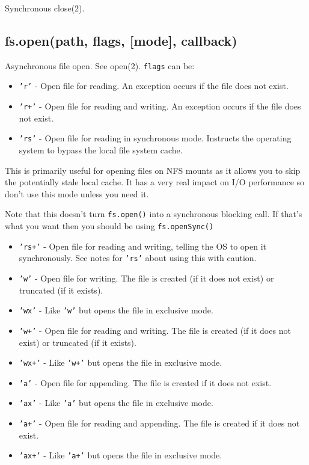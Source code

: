 Synchronous close(2).

\subsection{fs.open(path, flags, {[}mode{]}, callback)}

Asynchronous file open. See open(2). \texttt{flags} can be:

\begin{itemize}
\item
  \texttt{'r'} - Open file for reading. An exception occurs if the file
  does not exist.
\item
  \texttt{'r+'} - Open file for reading and writing. An exception occurs
  if the file does not exist.
\item
  \texttt{'rs'} - Open file for reading in synchronous mode. Instructs
  the operating system to bypass the local file system cache.
\end{itemize}

This is primarily useful for opening files on NFS mounts as it allows
you to skip the potentially stale local cache. It has a very real impact
on I/O performance so don't use this mode unless you need it.

Note that this doesn't turn \texttt{fs.open()} into a synchronous
blocking call. If that's what you want then you should be using
\texttt{fs.openSync()}

\begin{itemize}
\item
  \texttt{'rs+'} - Open file for reading and writing, telling the OS to
  open it synchronously. See notes for \texttt{'rs'} about using this
  with caution.
\item
  \texttt{'w'} - Open file for writing. The file is created (if it does
  not exist) or truncated (if it exists).
\item
  \texttt{'wx'} - Like \texttt{'w'} but opens the file in exclusive
  mode.
\item
  \texttt{'w+'} - Open file for reading and writing. The file is created
  (if it does not exist) or truncated (if it exists).
\item
  \texttt{'wx+'} - Like \texttt{'w+'} but opens the file in exclusive
  mode.
\item
  \texttt{'a'} - Open file for appending. The file is created if it does
  not exist.
\item
  \texttt{'ax'} - Like \texttt{'a'} but opens the file in exclusive
  mode.
\item
  \texttt{'a+'} - Open file for reading and appending. The file is
  created if it does not exist.
\item
  \texttt{'ax+'} - Like \texttt{'a+'} but opens the file in exclusive
  mode.
\end{itemize}

